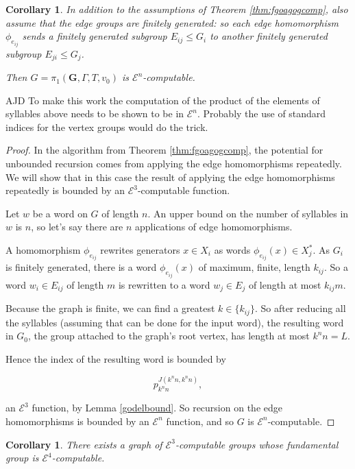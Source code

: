 \documentclass[a4paper]{article}
\newcommand{\grz}[1]{$\mathcal{E}^{#1}$}	%
\theoremstyle{plain}
\newtheorem{corollary}[theorem]{Corollary}
\theoremstyle{definition}
\newenvironment{ad}{\noindent\color{blue} AJD }{}
\newcommand{\ajd}[1]{
\begin{ad} #1 \end{ad}}
\begin{document}
\begin{corollary}

In addition to the  assumptions of Theorem \ref{thm:fgoagogcomp}, also assume that the edge groups are finitely generated: so each edge homomorphism $\phi_{e_{ij}}$ sends a finitely generated subgroup $E_{ij} \leq G_i$ to another finitely generated subgroup $E_{ji} \leq G_j$.

Then $G = \pi_1(\mathbf{G}, \Gamma, T, v_0)$ is \grz{n}-computable.

\end{corollary}
\ajd{To make this work the computation of the product of the elements of
syllables above needs to be shown to be in \grz{n}. Probably the use
of standard indices for the vertex groups would do the trick.}
\begin{proof}

In the algorithm from Theorem \ref{thm:fgoagogcomp}, the potential for unbounded recursion comes from applying the edge homomorphisms repeatedly. We will show that in this case the result of applying the edge homomorphisms repeatedly is bounded by an \grz{3}-computable function.

Let $w$ be a word on $G$ of length $n$. An upper bound on the number of syllables in $w$ is $n$, so let's say there are $n$ applications of edge homomorphisms.

A homomorphism $\phi_{e_{ij}}$ rewrites generators $x \in X_i$ as words $\phi_{e_{ij}}(x) \in X_j^{\ast}$. As $G_i$ is finitely generated, there is a word $\phi_{e_{ij}}(x)$ of maximum, finite, length $k_{ij}$. So a word $w_i \in E_{ij}$ of length $m$ is rewritten to a word $w_j \in E_j$ of length at most $k_{ij}m$.

Because the graph is finite, we can find a greatest $k \in \{k_{ij}\}$. So after reducing all the syllables (assuming that can be done for the input word), the resulting word in $G_0$, the group attached to the graph's root vertex, has length at most $k^n n = L$.

Hence the index of the resulting word is bounded by

\[ p_{k^nn}^{J(k^nn,k^nn)},\]

an \grz{3} function, by Lemma \ref{godelbound}. So recursion on the edge homomorphisms is bounded by an \grz{n} function, and so $G$ is \grz{n}-computable.

\end{proof}

\begin{corollary}
There exists a graph of \grz{3}-computable groups whose fundamental group is \grz{4}-computable.
\end{corollary}
\end{document}
